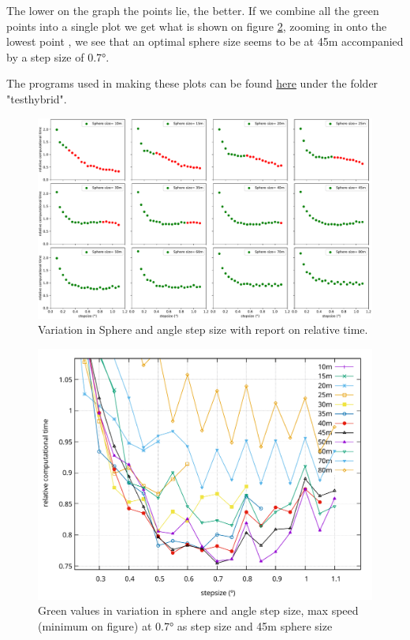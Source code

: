 The lower on the graph the points lie, the better. If we combine all the green points into a single plot
we get what is shown on figure \ref{fig:SphereStepFinal},
zooming in onto the lowest point , we see that an optimal sphere size seems to be at 45m accompanied
by a step size of 0.7°.

The programs used in making these plots can be found \href{https://github.com/arthuradriaens-code/projects-mt}{here}
under the folder "testhybrid".
\begin{figure}
	\includegraphics[width=\textwidth]{figures/subplotofallstepsphere.pdf}
	\caption{Variation in Sphere and angle step size with report on relative time.}
	\label{fig:SphereStepInfl}
\end{figure}
\begin{figure}
	\includegraphics[width=\textwidth]{figures/SphereAndStepFinal.pdf}
	\caption{Green values in variation in sphere and angle step size, max speed (minimum on figure) at 0.7° as step size and 45m sphere size}
	\label{fig:SphereStepFinal}
\end{figure}
\newpage
